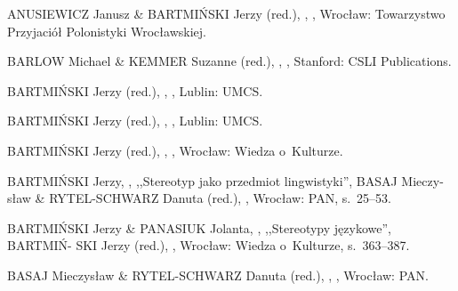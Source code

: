 \documentclass[11pt,a4paper,twoside]{report}
\begin{document}
\begin{thebibliography}{}

{ANUSIEWICZ Janusz \& BARTMIŃSKI Jerzy (red.)},
,
,
\newblock Wrocław: Towarzystwo Przyjaciół Polonistyki Wrocławskiej.

{BARLOW Michael \& KEMMER Suzanne (red.)},
,
,
\newblock Stanford: CSLI Publications.

{BARTMIŃSKI Jerzy (red.)},
,
,
\newblock Lublin: UMCS.

{BARTMIŃSKI Jerzy (red.)},
,
,
\newblock Lublin: UMCS.

{BARTMIŃSKI Jerzy (red.)},
,
,
\newblock Wrocław: Wiedza o~Kulturze.

{BARTMIŃSKI Jerzy},
,
\newblock ,,Stereotyp jako przedmiot lingwistyki'',
\newblock {[w:]} {BASAJ Mieczy- sław \& RYTEL-SCHWARZ Danuta (red.)}, ,
\newblock Wrocław: PAN,
\newblock s.~25--53.

{BARTMIŃSKI Jerzy \& PANASIUK Jolanta},
,
\newblock ,,Stereotypy językowe'',
\newblock {[w:]} {BARTMIŃ- SKI Jerzy (red.)},
,
\newblock Wrocław: Wiedza o~Kulturze,
\newblock s.~363--387.

{BASAJ Mieczysław \& RYTEL-SCHWARZ Danuta (red.)},
,
,
\newblock Wrocław: PAN.


\end{thebibliography}
\end{document}
